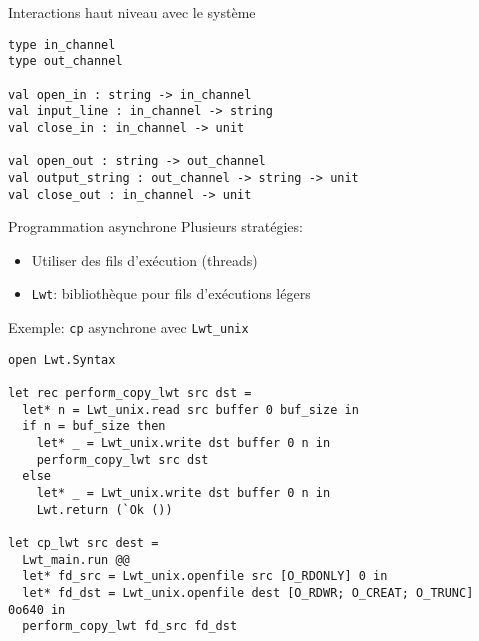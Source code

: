 
\begin{frame}[fragile]{Interactions haut niveau avec le système}
 

\begin{lstlisting}
type in_channel
type out_channel

val open_in : string -> in_channel
val input_line : in_channel -> string
val close_in : in_channel -> unit

val open_out : string -> out_channel
val output_string : out_channel -> string -> unit
val close_out : in_channel -> unit

\end{lstlisting}
    
\end{frame}

\begin{frame}{Programmation asynchrone}
Plusieurs stratégies:
\begin{itemize}
    \item Utiliser des fils d'exécution (threads)
    \item \texttt{Lwt}: bibliothèque pour fils d'exécutions légers
\end{itemize}
\end{frame}

\begin{frame}[fragile]{Exemple: \texttt{cp} asynchrone avec \texttt{Lwt\_unix}}

\begin{lstlisting}
open Lwt.Syntax

let rec perform_copy_lwt src dst =
  let* n = Lwt_unix.read src buffer 0 buf_size in
  if n = buf_size then
    let* _ = Lwt_unix.write dst buffer 0 n in
    perform_copy_lwt src dst
  else
    let* _ = Lwt_unix.write dst buffer 0 n in
    Lwt.return (`Ok ())

let cp_lwt src dest =
  Lwt_main.run @@
  let* fd_src = Lwt_unix.openfile src [O_RDONLY] 0 in 
  let* fd_dst = Lwt_unix.openfile dest [O_RDWR; O_CREAT; O_TRUNC] 0o640 in
  perform_copy_lwt fd_src fd_dst
\end{lstlisting}
    
\end{frame}